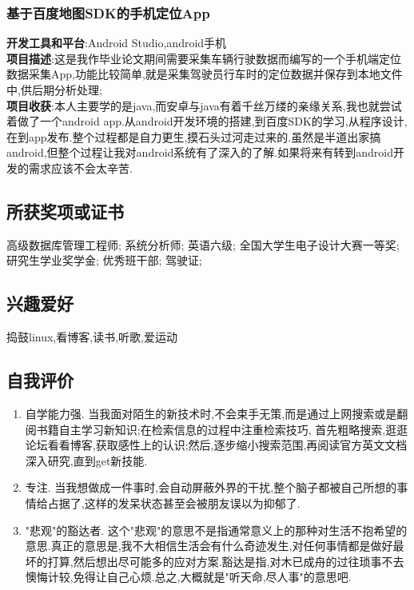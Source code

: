 \documentclass[11pt]{ctexart}
\begin{document}
\subsubsection{基于百度地图SDK的手机定位App}
\label{sec-1-6-2}
\textbf{开发工具和平台}:Android Studio,android手机\\
\textbf{项目描述}:这是我作毕业论文期间需要采集车辆行驶数据而编写的一个手机端定位数据采集App,功能比较简单,就是采集驾驶员行车时的定位数据并保存到本地文件中,供后期分析处理;\\
\textbf{项目收获}:本人主要学的是java,而安卓与java有着千丝万缕的亲缘关系,我也就尝试着做了一个android app.从android开发环境的搭建,到百度SDK的学习,从程序设计,在到app发布.整个过程都是自力更生,摸石头过河走过来的.虽然是半道出家搞android,但整个过程让我对android系统有了深入的了解.如果将来有转到android开发的需求应该不会太辛苦.\\
\subsection{所获奖项或证书}
\label{sec-1-7}
高级数据库管理工程师;
系统分析师;
英语六级;
全国大学生电子设计大赛一等奖;
研究生学业奖学金;
优秀班干部;
驾驶证;
\subsection{兴趣爱好}
\label{sec-1-8}
捣鼓linux,看博客,读书,听歌,爱运动
\subsection{自我评价}
\label{sec-1-9}
\begin{enumerate}
\item 自学能力强. 当我面对陌生的新技术时,不会束手无策,而是通过上网搜索或是翻阅书籍自主学习新知识;在检索信息的过程中注重检索技巧, 首先粗略搜索,逛逛论坛看看博客,获取感性上的认识;然后,逐步缩小搜索范围,再阅读官方英文文档深入研究,直到get新技能.\\
\item 专注. 当我想做成一件事时,会自动屏蔽外界的干扰,整个脑子都被自己所想的事情给占据了,这样的发呆状态甚至会被朋友误以为抑郁了.\\
\item "悲观"的豁达者. 这个"悲观"的意思不是指通常意义上的那种对生活不抱希望的意思.真正的意思是,我不大相信生活会有什么奇迹发生,对任何事情都是做好最坏的打算,然后想出尽可能多的应对方案.豁达是指,对木已成舟的过往琐事不去懊悔计较,免得让自己心烦.总之,大概就是"听天命,尽人事"的意思吧.
\end{enumerate}
\end{document}
